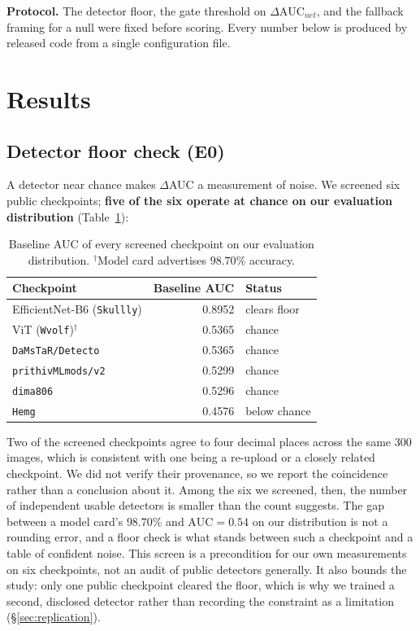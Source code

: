 \documentclass[journal]{IEEEtran}
\begin{document}
\textbf{Protocol.} The detector floor, the gate threshold on
$\Delta\mathrm{AUC}_{net}$, and the fallback framing for a null were fixed
before scoring. Every number below is produced by released code from a single
configuration file.

\section{Results}

\subsection{Detector floor check (E0)}
\label{sec:e0}

A detector near chance makes $\Delta$AUC a measurement of noise. We screened
six public checkpoints; \textbf{five of the six operate at chance on our
evaluation distribution} (Table~\ref{tab:e0}):

\begin{table}[t]
\centering
\caption{Baseline AUC of every screened checkpoint on our evaluation
distribution. $^{\dagger}$Model card advertises $98.70\%$ accuracy.}
\label{tab:e0}
\footnotesize
\setlength{\tabcolsep}{4pt}
\begin{tabular}{lrl}
\toprule
Checkpoint & Baseline AUC & Status \\
\midrule
EfficientNet-B6 (\texttt{Skullly}) & 0.8952 & clears floor \\
ViT (\texttt{Wvolf})$^{\dagger}$ & 0.5365 & chance \\
\texttt{DaMsTaR/Detecto} & 0.5365 & chance \\
\texttt{prithivMLmods/v2} & 0.5299 & chance \\
\texttt{dima806} & 0.5296 & chance \\
\texttt{Hemg} & 0.4576 & below chance \\
\bottomrule
\end{tabular}
\end{table}

Two of the screened checkpoints agree to four decimal places across the same
300 images, which is consistent with one being a re-upload or a closely
related checkpoint. We did not verify their provenance, so we report the
coincidence rather than a conclusion about it. Among the six we screened,
then, the number of independent usable detectors is smaller than the count
suggests. The gap between a model card's $98.70\%$ and $\mathrm{AUC}=0.54$ on
our distribution is not a rounding error, and a floor check is what stands
between such a checkpoint and a table of confident noise. This screen is a
precondition for our own measurements on six checkpoints, not an audit of
public detectors generally. It also bounds the study: only one public
checkpoint cleared the floor, which is why we trained a second, disclosed
detector rather than recording the constraint as a limitation
(\S\ref{sec:replication}).
\end{document}
